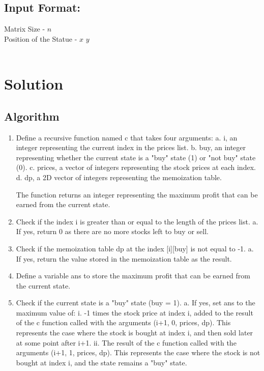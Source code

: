 \documentclass{article}
\begin{document}
    \subsection{Input Format:}
        Matrix Size - $n$\\
        Position of the Statue - $x$ $y$\\
    \\


     \newpage
     \section{Solution}
     \subsection{Algorithm}
     \begin{enumerate}
        \item Define a recursive function named c that takes four arguments:
           a. i, an integer representing the current index in the prices list.
           b. buy, an integer representing whether the current state is a "buy" state (1) or "not buy" state (0).
           c. prices, a vector of integers representing the stock prices at each index.
           d. dp, a 2D vector of integers representing the memoization table.
        
           The function returns an integer representing the maximum profit that can be earned from the current state.
        
        \item Check if the index i is greater than or equal to the length of the prices list.
           a. If yes, return 0 as there are no more stocks left to buy or sell.
        
        \item Check if the memoization table dp at the index [i][buy] is not equal to -1.
           a. If yes, return the value stored in the memoization table as the result.
        
        \item Define a variable ans to store the maximum profit that can be earned from the current state.
        
        \item Check if the current state is a "buy" state (buy = 1).
           a. If yes, set ans to the maximum value of:
              i. -1 times the stock price at index i, added to the result of the c function called with the arguments (i+1, 0, prices, dp).
                 This represents the case where the stock is bought at index i, and then sold later at some point after i+1.
              ii. The result of the c function called with the arguments (i+1, 1, prices, dp).
                 This represents the case where the stock is not bought at index i, and the state remains a "buy" state.
        

\end{enumerate}
\end{document}
